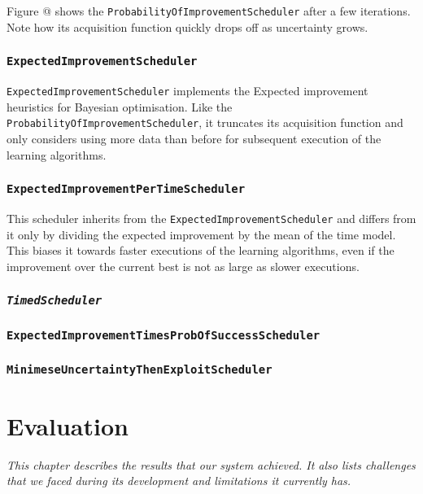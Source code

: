\documentclass[a4paper,12pt,twoside,openright]{report}
\begin{document}
Figure @ shows the \texttt{ProbabilityOfImprovementScheduler} after a few iterations. Note how its acquisition function quickly drops off as uncertainty grows.

\subsection{\texttt{ExpectedImprovementScheduler}}
\texttt{ExpectedImprovementScheduler} implements the Expected improvement heuristics for Bayesian optimisation. Like the \texttt{ProbabilityOfImprovementScheduler}, it truncates its acquisition function and only considers using more data than before for subsequent execution of the learning algorithms.

\subsection{\texttt{ExpectedImprovementPerTimeScheduler}}
This scheduler inherits from the \texttt{ExpectedImprovementScheduler} and differs from it only by dividing the expected improvement by the mean of the time model. This biases it towards faster executions of the learning algorithms, even if the improvement over the current best is not as large as slower executions.

\subsection{\texttt{\textit{TimedScheduler}}}
\subsection{\texttt{ExpectedImprovementTimesProbOfSuccessScheduler}}
\subsection{\texttt{MinimeseUncertaintyThenExploitScheduler}}






\chapter{Evaluation}
\textit{This chapter describes the results that our system achieved. It also lists challenges that we faced during its development and limitations it currently has.}
\end{document}
